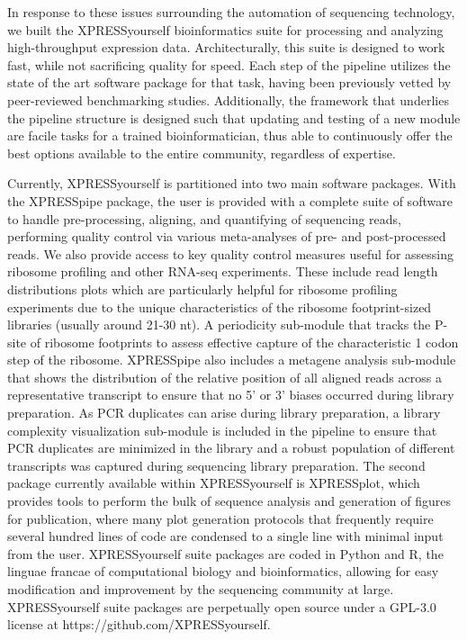 \documentclass[11pt, a4paper, oneside]{article}
\begin{document}
In response to these issues surrounding the automation of sequencing technology, we built the XPRESSyourself bioinformatics suite for processing and analyzing high-throughput expression data. Architecturally, this suite is designed to work fast, while not sacrificing quality for speed. Each step of the pipeline utilizes the state of the art software package for that task, having been previously vetted by peer-reviewed benchmarking studies. Additionally, the framework that underlies the pipeline structure is designed such that updating and testing of a new module are facile tasks for a trained bioinformatician, thus able to continuously offer the best options available to the entire community, regardless of expertise. \par

Currently, XPRESSyourself is partitioned into two main software packages. With the XPRESSpipe package, the user is provided with a complete suite of software to handle pre-processing, aligning, and quantifying of sequencing reads, performing quality control via various meta-analyses of pre- and post-processed reads. We also provide access to key quality control measures useful for assessing ribosome profiling and other RNA-seq experiments. These include read length distributions plots which are particularly helpful for ribosome profiling experiments due to the unique characteristics of the ribosome footprint-sized libraries (usually around 21-30 nt). A periodicity sub-module that tracks the P-site of ribosome footprints to assess effective capture of the characteristic 1 codon step of the ribosome. XPRESSpipe also includes a metagene analysis sub-module that shows the distribution of the relative position of all aligned reads across a representative transcript to ensure that no 5' or 3' biases occurred during library preparation. As PCR duplicates can arise during library preparation, a library complexity visualization sub-module is included in the pipeline to ensure that PCR duplicates are minimized in the library and a robust population of different transcripts was captured during sequencing library preparation. The second package currently available within XPRESSyourself is XPRESSplot, which provides tools to perform the bulk of sequence analysis and generation of figures for publication, where many plot generation protocols that frequently require several hundred lines of code are condensed to a single line with minimal input from the user. XPRESSyourself suite packages are coded in Python and R, the linguae francae of computational biology and bioinformatics, allowing for easy modification and improvement by the sequencing community at large. XPRESSyourself suite packages are perpetually open source under a GPL-3.0 license at https://github.com/XPRESSyourself.
\end{document}

